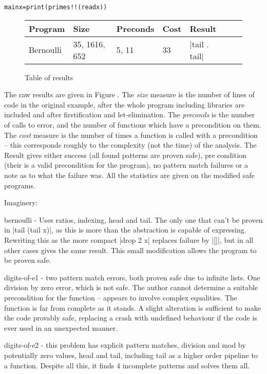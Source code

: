 \documentclass[preprint]{sigplanconf}
\newenvironment{code}{\begin{alltt}\small}{\end{alltt}}
\begin{document}
\begin{code}
main x = print (primes !! (read x))
\end{code}

\begin{figure}
\begin{tabular}{||l||l||l||l||l||l||l||}
\hline
Program & Size & Preconds & Cost & Result \\
\hline
Bernoulli & 35, 1616, 652 & 5, 11 & 33 & |tail . tail| \\
\hline
\end{tabular}
\caption{Table of results}
\label{fig:results}
\end{figure}

The raw results are given in Figure \cite{fig:results}. The \textit{size} measure is the number of lines of code in the original example, after the whole program including libraries are included and after firstification and let-elimination. The \textit{preconds} is the number of calls to error, and the number of functions which have a precondition on them. The \textit{cost} measure is the number of times a function is called with a precondition -- this corresponds roughly to the complexity (not the time) of the analysis. The Result gives either success (all found patterns are proven safe), pre condition (their is a valid precondition for the program), no pattern match failures or a note as to what the failure was. All the statistics are given on the modified safe programs.




Imaginery:

bernoulli - Uses ratios, indexing, head and tail. The only one that can't be proven in |tail (tail x)|, as this is more than the abstraction is capable of expressing. Rewriting this as the more compact |drop 2 x| replaces failure by |[]|, but in all other cases gives the same result. This small modification allows the program to be proven safe.

digits-of-e1 - two pattern match errors, both proven safe due to infinite lists. One division by zero error, which is not safe. The author cannot determine a suitable precondition for the function -- appears to involve complex equalities. The function is far from complete as it stands. A slight alteration is sufficient to make the code provably safe, replacing a crash with undefined behaviour if the code is ever used in an unexpected manner.

digits-of-e2 - this problem has explicit pattern matches, division and mod by potentially zero values, head and tail, including tail as a higher order pipeline to a function. Despite all this, it finds 4 incomplete patterns and solves them all.
\end{document}
